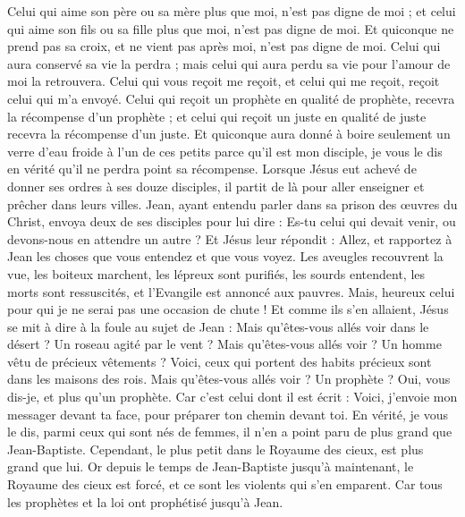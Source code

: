 \begin{multicols}{2}
Celui qui aime son père ou sa mère plus que moi, n'est pas digne de moi ; et celui qui aime son fils ou sa fille plus que moi, n'est pas digne de moi.
Et quiconque ne prend pas sa croix, et ne vient pas après moi, n'est pas digne de moi.
Celui qui aura conservé sa vie la perdra ; mais celui qui aura perdu sa vie pour l'amour de moi la retrouvera.
Celui qui vous reçoit me reçoit, et celui qui me reçoit, reçoit celui qui m'a envoyé.
Celui qui reçoit un prophète en qualité de prophète, recevra la récompense d'un prophète ; et celui qui reçoit un juste en qualité de juste recevra la récompense d'un juste.
Et quiconque aura donné à boire seulement un verre d'eau froide à l’un de ces petits parce qu’il est mon disciple, je vous le dis en vérité qu'il ne perdra point sa récompense.
\VerseOne{}Lorsque Jésus eut achevé de donner ses ordres à ses douze disciples, il partit de là pour aller enseigner et prêcher dans leurs villes.
Jean, ayant entendu parler dans sa prison des œuvres du Christ, envoya deux de ses disciples pour lui dire :
Es-tu celui qui devait venir, ou devons-nous en attendre un autre ?
Et Jésus leur répondit : Allez, et rapportez à Jean les choses que vous entendez et que vous voyez.
Les aveugles recouvrent la vue, les boiteux marchent, les lépreux sont purifiés, les sourds entendent, les morts sont ressuscités, et l'Evangile est annoncé aux pauvres{}.
Mais, heureux celui pour qui je ne serai pas une occasion de chute !
Et comme ils s'en allaient, Jésus se mit à dire à la foule au sujet de Jean : Mais qu'êtes-vous allés voir dans le désert ? Un roseau agité par le vent ?
Mais qu'êtes-vous allés voir ? Un homme vêtu de précieux vêtements ? Voici, ceux qui portent des habits précieux sont dans les maisons des rois.
Mais qu'êtes-vous allés voir ? Un prophète ? Oui, vous dis-je, et plus qu'un prophète.
Car c’est celui dont il est écrit : Voici, j'envoie mon messager{} devant ta face, pour préparer ton chemin devant toi.
En vérité, je vous le dis, parmi ceux qui sont nés de femmes, il n'en a point paru de plus grand que Jean-Baptiste. Cependant, le plus petit dans le Royaume des cieux, est plus grand que lui.
Or depuis le temps de Jean-Baptiste jusqu’à maintenant, le Royaume des cieux est forcé, et ce sont les violents qui s’en emparent.
Car tous les prophètes et la loi ont prophétisé jusqu'à Jean.

\end{multicols}
